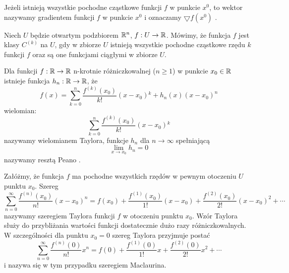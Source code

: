 \documentclass[12pt,a4paper]{report}
\begin{document}
\begin{definition} 
Jeżeli istnieją wszystkie pochodne cząstkowe funkcji $f$ w punkcie $x^0$, to wektor 
\begin{equation}
[\ddx{x_1}f_{x_{1}}(x_0), \cdots, \ddx{x_k}f_{x_{k}}(x_0)]
\end{equation}
 nazywamy gradientem funkcji $f$ w punkcie $x^0$ i oznaczamy $\bigtriangledown f(x^0)$ .
\end{definition}
\begin{definition}[klasa $C^{(k)}$]
Niech $U$ będzie otwartym podzbiorem $ \mathbb{R}^n $, $ f: U \to \mathbb{R} $. Mówimy, że funkcja $f$ jest klasy $C^{(k)}$ na $U$,  gdy w zbiorze $U$ istnieją wszystkie pochodne cząstkowe rzędu $k$ funkcji $f$ oraz są one funkcjami ciągłymi w zbiorze $U$. 
\end{definition}
\begin{theorem}
Dla funkcji $f: \mathbb{R} \to \mathbb{R}$ n-krotnie różniczkowalnej ($n \geq 1$) w punkcie $x_0 \in \mathbb{R} $ istnieje
funkcja $ h_n: \mathbb{R} \to \mathbb{R} $, że 
\begin{equation}
f(x) = \sum_{k=0}^{n} \frac{f^{(k)}(x_0)}{k!} (x-x_0){^k} + h_{n}(x)(x-x_0)^n 
\end{equation}
wielomian:
\begin{equation}
\sum_{k=0}^{n} \frac{f^{(k)}(x_0)}{k!} (x-x_0){^k}
\end{equation}
nazywamy wielomianem Taylora, funkcje $h_n$  dla $ n \to \infty$ spełniającą 
\begin{equation}
\lim_{x \to x_0} h_n = 0
\end{equation}
nazywamy resztą Peano .
\end{theorem}

\begin{definition}
Załóżmy, że funkcja $f$ ma pochodne wszystkich rzędów w pewnym otoczeniu $U$ punktu $x_0$. Szereg
\begin{equation}
\sum_{n=0}^{\infty} \frac{f^{(n)}(x_0)}{n!} (x-x_0)^n = f(x_0) + \frac{f^{(1)}(x_0)}{1!} (x-x_0) + \frac{f^{(2)}(x_0)}{2!} (x-x_0)^{2} + \cdots
\end{equation}
nazywamy szeregiem Taylora funkcji $f$ w otoczeniu punktu $x_0$. Wzór Taylora służy do przybliżania wartości funkcji dostatecznie dużo razy różniczkowalnych. W szczególności dla punktu $ x_0 = 0$ szereg Taylora przyjmuje postać 
\begin{equation}
\sum_{n=0}^{\infty} \frac{f^{(n)}(0)}{n!} x^n = f(0) + \frac{f^{(1)}(0)}{1!} x + \frac{f^{(2)}(0)}{2!}  x^{2} + \cdots
\end{equation}
i nazywa się w tym przypadku szeregiem Maclaurina. 

\end{definition}
\end{document}
